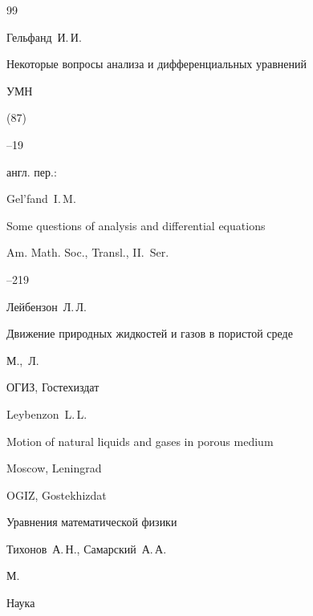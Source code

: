 \begin{thebibliography}{99}




\by Гельфанд~И.\,И.

\paper Некоторые вопросы анализа и дифференциальных уравнений

\jour УМН



(87)

--19


\transl англ. пер.:~

\by Gel'fand~I.\,M.

\paper Some questions of analysis and differential equations

\jour Am. Math. Soc., Transl., II.~Ser. 


--219 





\by Лейбензон~Л.\,Л.

\book Движение природных жидкостей и газов в пористой среде

\publaddr М.,~Л.

\publ ОГИЗ, Гостехиздат



\misctransl

\by Leybenzon~L.\,L.

\book  Motion of natural liquids and gases in porous medium

\publaddr Moscow, Leningrad

\publ OGIZ, Gostekhizdat







\book Уравнения математической физики

\by Тихонов~А.\,Н., Самарский~А.\,А.

\publaddr М.

\publ Наука


\end{thebibliography}
